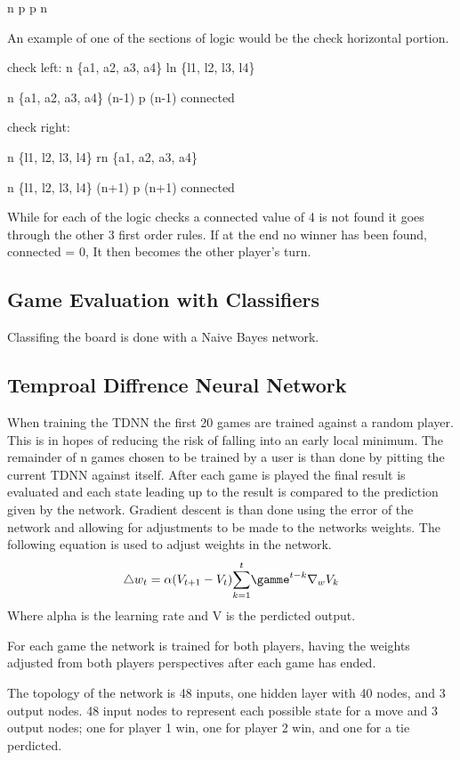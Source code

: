 \documentclass[12pt,letterpaper]{article}
\begin{document}
\exists n \ni p  \bigwedge p \in n

An example of one of the sections of logic would be the check horizontal portion.

check left:
n \in \{a1, a2, a3, a4\} \Rightarrow ln \in \{l1, l2, l3, l4\}

\neg n \in \{a1, a2, a3, a4\} \bigwedge (n-1)  \bigwedge p \in (n-1) \Rightarrow connected

check right:

n \in \{l1, l2, l3, l4\} \Rightarrow rn \in \{a1, a2, a3, a4\}

\neg n \in \{l1, l2, l3, l4\} \bigwedge (n+1)  \bigwedge p \in (n+1) \Rightarrow connected

While for each of the logic checks a connected value of 4 is not found it goes through the other 3 first order rules. If at the end no winner has been found, connected = 0, It then becomes the other player’s turn.

\subsection{Game Evaluation with Classifiers}
Classifing the board is done with a Naive Bayes network. 

\subsection{Temproal Diffrence Neural Network}
When training the TDNN the first 20 games are trained against a random player. This is in hopes of reducing the risk of falling into an early local minimum. The remainder of n games chosen to be trained by a user is than done by pitting the current TDNN against itself. After each game is played the final result is evaluated and each state leading up to the result is compared to the prediction given by the network. Gradient descent is than done using the error of the network and allowing for adjustments to be made to the networks weights. The following equation is used to adjust weights in the network. 
\[
{\triangle} w_t = \alpha (V _{t + 1} - V _t)  \overset{t}{\sum_{k = 1}} {\gamme}^{t - k} {\nabla}_w V_k
\]
Where alpha is the learning rate and V is the perdicted output.

For each game the network is trained for both players, having the weights adjusted from both players perspectives after each game has ended.

The topology of the network is 48 inputs, one hidden layer with 40 nodes, and 3 output nodes. 48 input nodes to represent each possible state for a move and 3 output nodes; one for player 1 win, one for player 2 win, and one for a tie perdicted. 
\end{document}
